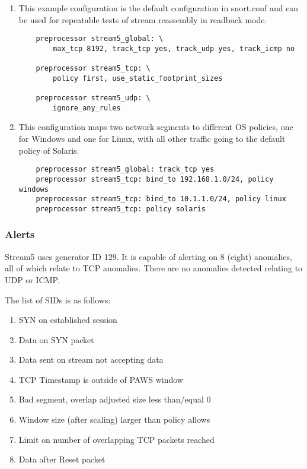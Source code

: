 \documentclass[english]{report}
\begin{document}
\begin{enumerate}

\item{}

This example configuration is the default configuration in snort.conf and
can be used for repeatable tests of stream reassembly in readback mode.

\begin{verbatim}
    preprocessor stream5_global: \
        max_tcp 8192, track_tcp yes, track_udp yes, track_icmp no

    preprocessor stream5_tcp: \
        policy first, use_static_footprint_sizes

    preprocessor stream5_udp: \
        ignore_any_rules
\end{verbatim}

\item{}

This configuration maps two network segments to different OS policies, one for
Windows and one for Linux, with all other traffic going to the default policy
of Solaris.

\begin{verbatim}
    preprocessor stream5_global: track_tcp yes
    preprocessor stream5_tcp: bind_to 192.168.1.0/24, policy windows
    preprocessor stream5_tcp: bind_to 10.1.1.0/24, policy linux
    preprocessor stream5_tcp: policy solaris
\end{verbatim}

\end{enumerate}

\subsubsection{Alerts}

Stream5 uses generator ID 129.  It is capable of alerting on 8 (eight)
anomalies, all of which relate to TCP anomalies.  There are no anomalies
detected relating to UDP or ICMP.

The list of SIDs is as follows:

\begin{enumerate}
\item{SYN on established session}
\item{Data on SYN packet}
\item{Data sent on stream not accepting data}
\item{TCP Timestamp is outside of PAWS window}
\item{Bad segment, overlap adjusted size less than/equal 0}
\item{Window size (after scaling) larger than policy allows}
\item{Limit on number of overlapping TCP packets reached}
\item{Data after Reset packet}
\end{enumerate}
\end{document}
